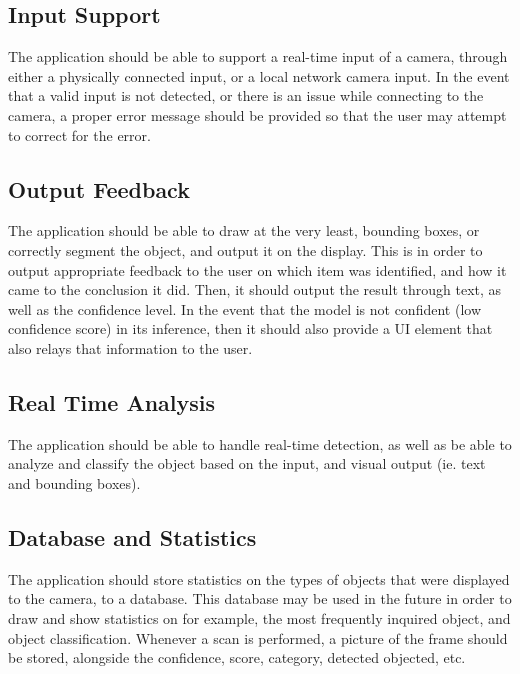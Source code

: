 \documentclass[conference]{IEEEtran}
\begin{document}
\subsection{Input Support}

The application should be able to support a real-time input of a camera, through either a physically connected input, or a local network camera input.
In the event that a valid input is not detected, or there is an issue while connecting to the camera, a proper error message should be provided so that the user may attempt to correct for the error.

\subsection{Output Feedback}

The application should be able to draw at the very least, bounding boxes, or correctly segment the object, and output it on the display. This is in order to output appropriate feedback to the user on which item was identified, and how it came to the conclusion it did. Then, it should output the result through text, as well as the confidence level.
In the event that the model is not confident (low confidence score) in its inference, then it should also provide a UI element that also relays that information to the user.

\subsection{Real Time Analysis}

The application should be able to handle real-time detection, as well as be able to analyze and classify the object based on the input, and  visual output (ie. text and bounding boxes). 

\subsection{Database and Statistics}

The application should store statistics on the types of objects that were displayed to the camera, to a database. This database may be used in the future in order to draw and show statistics on for example, the most frequently inquired object, and object classification.
\newline
Whenever a scan is performed, a picture of the frame should be stored, alongside the confidence, score, category, detected objected, etc.
\end{document}
